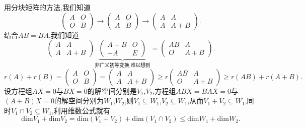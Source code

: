 \documentclass{article}
\begin{document}
用分块矩阵的方法,我们知道
\begin{equation*}
    \left(
    \begin{array}{cc}
        A & O \\
        O & B
    \end{array}
    \right)
    \longrightarrow
    \left(
    \begin{array}{cc}
        A & O \\
        A & B
    \end{array}
    \right)
    \longrightarrow
    \left(
    \begin{array}{cc}
        A & A     \\
        A & A + B
    \end{array}
    \right).
\end{equation*}
结合$AB = BA$,我们知道
\begin{equation*}
    \left(
    \begin{array}{cc}
            A & A     \\
            A & A + B
        \end{array}
    \right)
    \underbrace{\left(              %
        \begin{array}{cc}
            A + B & O \\
            -A    & E
        \end{array}
        \right)}_{\text{非广义初等变换,难以想到}}
    =
    \left(
    \begin{array}{cc}
            AB & A     \\
            O  & A + B
        \end{array}
    \right).
\end{equation*}
\begin{equation*}
    r \left(A\right) + r \left(B\right)
    =
    \left(
    \begin{array}{cc}
        A & O \\
        O & B
    \end{array}
    \right)
    =
    \left(
    \begin{array}{cc}
        A & A     \\
        A & A + B
    \end{array}
    \right)
    \ge
    r \left(
    \begin{array}{cc}
        AB & A     \\
        O  & A + B
    \end{array}
    \right)
    \ge
    r \left(AB\right) + r \left(A + B\right).
\end{equation*}
设方程组$AX = 0$与$BX = 0$的解空间分别是$V_1$,$V_2$,方程组$ABX = BAX = 0$与$\left(A + B\right)X = 0$的解空间分别为$W_1$,$W_2$,则$V_1\subseteq W_1$,$V_2\subseteq W_1$,从而$V_1 + V_2\subseteq W_1$,同时$V_1\cap V_2 \subseteq W_1$,利用维数公式就有
\begin{equation*}
    \mathrm{dim}V_1 + \mathrm{dim}V_2 = \mathrm{dim}\left(V_1 + V_2\right) + \mathrm{dim}\left(V_1 \cap V_2\right) \le \mathrm{dim}W_1 + \mathrm{dim}W_2.
\end{equation*}
\end{document}
